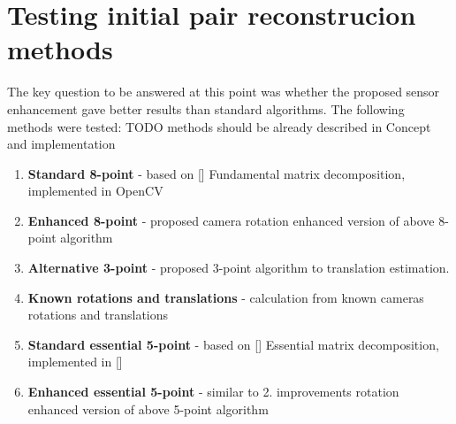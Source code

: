 \section{Testing initial pair reconstrucion methods} \label{sec:Testin2Views}
The key question to be answered at this point was whether the proposed sensor enhancement gave better results than standard algorithms.
The following methods were tested: TODO methods should be already described in Concept and implementation
\begin{enumerate}
\item \textbf{Standard 8-point} - based on [] Fundamental matrix decomposition, implemented in OpenCV
\item \textbf{Enhanced 8-point} - proposed camera rotation enhanced version of above 8-point algorithm
\item \textbf{Alternative 3-point} - proposed 3-point algorithm to translation estimation.
\item \textbf{Known rotations and translations} - calculation from known cameras rotations and translations
\item \textbf{Standard essential 5-point} - based on [] Essential matrix decomposition, implemented in []
\item \textbf{Enhanced essential 5-point} - similar to 2. improvements rotation enhanced version of above 5-point algorithm
\end{enumerate}
